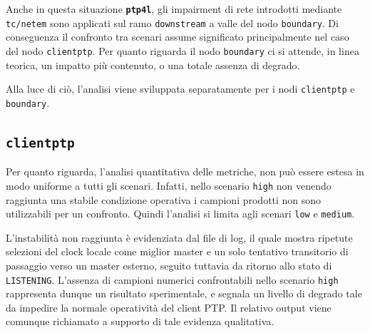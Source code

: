 Anche in questa situazione \texttt{\textbf{ptp4l}}, gli impairment di rete
introdotti mediante \texttt{tc/netem} sono applicati sul ramo \texttt{downstream}
a valle del nodo \texttt{boundary}. Di conseguenza il confronto tra scenari
assume significato principalmente nel caso del nodo \texttt{clientptp}. Per
quanto riguarda il nodo \texttt{boundary} ci si attende, in linea teorica, un impatto
più contenuto, o una totale assenza di degrado.

Alla luce di ciò, l'analisi viene sviluppata separatamente per i nodi \texttt{clientptp}
e \texttt{boundary}.

\subsection{\texttt{clientptp}}
Per quanto riguarda, l'analisi quantitativa delle metriche, non può essere estesa
in modo uniforme a tutti gli scenari. Infatti, nello scenario \texttt{high} non
venendo raggiunta una stabile condizione operativa i campioni prodotti non sono
utilizzabili per un confronto. Quindi l'analisi si limita agli scenari \texttt{low}
e \texttt{medium}.

L'instabilità non raggiunta è evidenziata dal file di log, il quale mostra
ripetute selezioni del clock locale come miglior master e un solo tentativo
transitorio di passaggio verso un master esterno, seguito tuttavia da ritorno allo
stato di \texttt{LISTENING}. L'assenza di campioni numerici confrontabili nello scenario
\texttt{high} rappresenta dunque un risultato sperimentale, e segnala un livello di
degrado tale da impedire la normale operatività del client PTP. Il relativo
output viene comunque richiamato a supporto di tale evidenza qualitativa.

